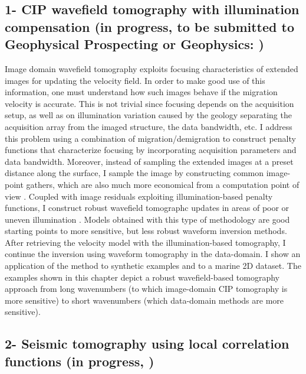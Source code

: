 \subsection{1- CIP wavefield tomography with illumination compensation (in progress, to be submitted 
to Geophysical Prospecting or Geophysics: \citep{pantin2015optimizing} )}

Image domain wavefield tomography exploits focusing characteristics of extended images 
for updating the velocity field. In order to make good use of this information, one must 
understand how such images behave if the migration velocity is accurate. This is not trivial 
since focusing depends on the acquisition setup, as well as on illumination variation caused by 
the geology separating the acquisition array from the imaged structure, the data bandwidth, etc. I 
address this problem using a combination of migration/demigration to construct penalty functions that
 characterize focusing by incorporating acquisition parameters and data bandwidth. Moreover, instead of
 sampling the extended images at a preset distance along the surface, I sample the image by constructing 
common image-point gathers, which are also much more economical from a computation point of view \citep{SavaVasconselos}. Coupled
 with image residuals exploiting illumination-based penalty functions, I construct robust wavefield 
tomographc updates in areas of poor or uneven illumination \citep{tony_seg:cwp12}. Models obtained with this type of methodology 
are good starting points to more sensitive, but less robust waveform inversion methods. After retrieving
the velocity model with the illumination-based tomography, I continue the inversion using 
waveform tomography in the data-domain. I show an application of the method to synthetic examples 
and to a marine 2D dataset. The examples shown in this chapter depict a 
robust wavefield-based tomography approach from long wavenumbers (to which image-domain
CIP tomography is more sensitive) to short wavenumbers (which data-domain methods
are more sensitive).

\subsection{2- Seismic tomography using local correlation functions (in progress, \cite{DiazLcorr})}

